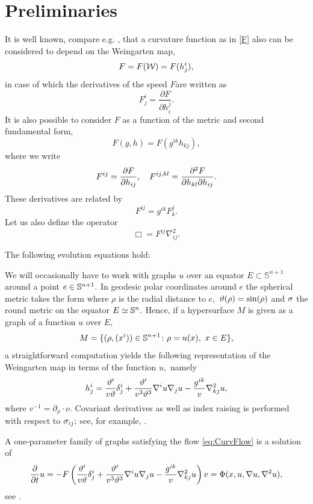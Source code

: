 \documentclass{amsart}
\begin{document}
\section{Preliminaries}\label{prelim}
\label{sec:prelim}
It is well known, compare e.g. \cite[Ch.~2]{Gerhardt:/2006}, that a curvature function as in \cref{F} also can be considered to depend on the Weingarten map,
\[F=F(\mc{W})=F(h^i_j),\]
in case of which the derivatives of the speed \(F\)are written as
\[
F^{i}_{j} = \frac{\partial F}{\partial h^{j}_{i}}.
\]
It is also possible to consider $F$ as a function of the metric and second fundamental form,
\[
F(g, h) = F(g^{ik} h_{kj}),
\]
where we write
\[
F^{ij} = \frac{\partial F}{\partial h_{ij}}, \quad F^{ij,kl} = \fr{\partial^2F}{\partial h_{kl} \partial h_{ij}}.
\]
These derivatives are related by
\[F^{ij}=g^{ik}F^j_k.\]
Let us also define the operator
\[
\Box = F^{ij} \nabla^2_{ij}.
\]
\begin{lemma} \label{lem: basi ev}
The following evolution equations hold:
\end{lemma}

We will occasionally have to work with graphs \(u\) over an equator $E \subset \mathbb{S}^{n+1}$ around a point $e\in\S^{n+1}.$ In geodesic polar coordinates around $e$ the spherical metric takes the form
where $\rho$ is the radial distance to $e,$ $\vt(\rho)=\sin(\rho)$ and $\s$ the round metric on the equator $E\simeq \S^n.$ Hence, if a hypersurface $M$ is given as a graph of a function $u$ over $E$,
\[M=\{(\rho,(x^i))\in \S^{n+1}\cn \rho=u(x),~ x\in E\},\]
a straightforward computation yields the following representation of the Weingarten map in terms of the function $u,$ namely
$$\label{graph h}h^i_j=\fr{\vt'}{v\vt}\d^i_j+\fr{\vt'}{v^3\vt^3}\nabla^iu\nabla_ju-\fr{g^{ik}}{v}\nabla^2_{kj}u,$$
where $v^{-1} = \partial_\rho \cdot \nu.$ Covariant derivatives as well as index raising is performed with respect to $\s_{ij};$ see, for example, \cite[(3.82)]{Scheuer:05/2015}.

A one-parameter family of graphs satisfying the flow \eqref{eq:CurvFlow} is a solution of
\begin{equation}
\label{eq:GraphCurvFlow}
\fr{\del}{\del t}u=-F\br{\fr{\vt'}{v\vt}\d^{i}_{j}+\fr{\vt'}{v^{3}\vt^{3}}\nabla^{i}u\nabla_{j}u-\fr{g^{ik}}{v}\nabla^{2}_{kj}u}v=\Phi(x,u,\nabla u,\nabla^{2}u),
\end{equation}
see \cite[p.~98-99]{Gerhardt:/2006}.
\end{document}

